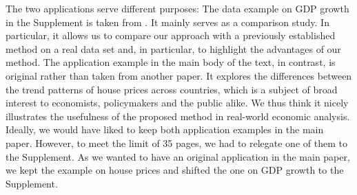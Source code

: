 \documentclass[a4paper,12pt]{article}
\begin{document}
\begin{enumerate}[label=\arabic*.,leftmargin=0.6cm]
The two applications serve different purposes:
The data example on GDP growth in the Supplement is taken from \cite{Zhang2012}. It mainly serves as a comparison study. In particular, it allows us to compare our approach with a previously established method on a real data set and, in particular, to highlight the advantages of our method. 
The application example in the main body of the text, in contrast, is original rather than taken from another paper. It explores the differences between the trend patterns of house prices across countries, which is a subject of broad interest to economists, policymakers and the public alike. We thus think it nicely illustrates the usefulness of the proposed method in real-world economic analysis. \\
Ideally, we would have liked to keep both application examples in the main paper. However, to meet the limit of 35 pages, we had to relegate one of them to the Supplement. As we wanted to have an original application in the main paper, we kept the example on house prices and shifted the one on GDP growth to the Supplement. 





\end{enumerate}
\end{document}
